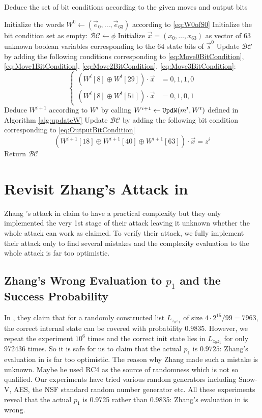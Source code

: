 \begin{algorithm}[htbp]
	\caption{Deduce the set of bit conditions according to the given moves and output bits} \label{alg:getBC}
	\begin{algorithmic}[1]
\State Initialize the words $W^0\leftarrow (\vec e_0,\ldots, \vec e_{63})$ according to \eqref{eq:W0ofS0}
\State Initialize the bit condition set as empty: $\mathcal{BC}\leftarrow \phi$
\State Initialize $\vec{x}=(x_0,\ldots, x_{63})$ as vector of 63 unknown boolean variables corresponding to the 64 state bits of $\vec s^0$
\State Update $\mathcal{BC}$ by adding the following conditions corresponding to \eqref{eq:Move0BitCondition}, \eqref{eq:Move1BitCondition}, \eqref{eq:Move2BitCondition}, \eqref{eq:Move3BitCondition}:
\[
\left\{
\begin{aligned}
(W^i[8]\oplus W^t[29])\cdot \vec x&=0,1,1,0\\
(W^i[8]\oplus W^t[51])\cdot \vec x&=0,1,0,1
\end{aligned}
\right.
\]
\EndIf
\State Deduce $W^{i+1}$ according to $W^{i}$ by calling $W^{i+1}\leftarrow {\tt UpdW}(m^t,W^t)$ defined in Algorithm \ref{alg:updateW}
\State Update $\mathcal{BC}$ by adding the following bit condition corresponding to \eqref{eq:OutputBitCondition}
\[
(W^{i+1}[18]\oplus W^{i+1}[40]\oplus W^{i+1}[63])\cdot \vec x =z^i
\]
\EndFor
\State Return $\mathcal{BC}$
		\EndProcedure
	\end{algorithmic}
\end{algorithm}


\section{Revisit Zhang's Attack in \cite{AC:Zhang19}}
Zhang \etal's attack in \cite{AC:Zhang19} claim to have a practical complexity but they only implemented the very 1st stage of their attack leaving it unknown whether the whole attack can work as claimed.
To verify their attack, we fully implement their attack only to find several mistakes and the complexity evaluation to the whole attack is far too optimistic.
\subsection{Zhang's Wrong Evaluation to $p_1$ and the Success Probability}
In \cite{AC:Zhang19}, they claim that for a randomly constructed list $L_{z_0z_1}$ of size $4\cdot 2^{15}/99=7963$, the correct internal state can be covered with probability $0.9835$.
However, we repeat the experiment $10^6$ times and the correct init state lies in $L_{z_0z_1}$ for only 972436 times.
So it is safe for us to claim that the actual $p_1$ is $0.9725$: Zhang's evaluation in \cite{AC:Zhang19} is far too optimistic.
The reason why Zhang made such a mistake is unknown.
Maybe he used RC4 as the source of randomness which is not so qualified.
Our experiments have tried various random generators including Snow-V, AES, the NSF standard random number generator etc.
All these experiments reveal that the actual $p_1$ is 0.9725 rather than 0.9835: Zhang's evaluation in \cite{AC:Zhang19} is wrong.

